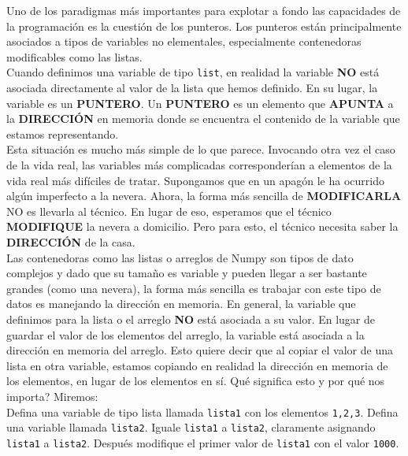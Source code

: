 \documentclass[11pt,letterpaper]{exam}
\begin{document}
\begin{questions}

Uno de los paradigmas m\'as importantes para explotar a fondo las capacidades de la programaci\'on es la cuesti\'on de los punteros. Los punteros est\'an principalmente asociados a tipos de variables no elementales, especialmente contenedoras modificables como las listas.\\

Cuando definimos una variable de tipo \verb"list", en realidad la variable \textbf{NO} est\'a asociada directamente al valor de la lista que hemos definido. En su lugar, la variable es un \textbf{PUNTERO}. Un \textbf{PUNTERO} es un elemento que \textbf{APUNTA} a la \textbf{DIRECCI\'ON} en memoria donde se encuentra el contenido de la variable que estamos representando.\\

Esta situaci\'on es mucho m\'as simple de lo que parece. Invocando otra vez el caso de la vida real, las variables m\'as complicadas corresponder\'ian a elementos de la vida real m\'as dif\'iciles de tratar. Supongamos que en un apag\'on le ha ocurrido alg\'un imperfecto a la nevera. Ahora, la forma m\'as sencilla de \textbf{MODIFICARLA} NO es llevarla al t\'ecnico. En lugar de eso, esperamos que el t\'ecnico \textbf{MODIFIQUE} la nevera a domicilio. Pero para esto, el t\'ecnico necesita saber la \textbf{DIRECCI\'ON} de la casa.\\
 
Las contenedoras como las listas o arreglos de Numpy son tipos de dato complejos y dado que su tama\~no es variable y pueden llegar a ser bastante grandes (como una nevera), la forma m\'as sencilla es trabajar con este tipo de datos es manejando la direcci\'on en memoria. En general, la variable que definimos para la lista o el arreglo \textbf{NO} est\'a asociada a su valor. En lugar de guardar el valor de los elementos del arreglo, la variable est\'a asociada a la direcci\'on en memoria del arreglo. Esto quiere decir que al copiar el valor de una lista en otra variable, estamos copiando en realidad la direcci\'on en memoria de los elementos, en lugar de los elementos en s\'i. Qu\'e significa esto y por qu\'e nos importa? Miremos:\\

Defina una variable de tipo lista llamada \verb"lista1" con los elementos \verb"1,2,3". Defina una variable llamada \verb"lista2". Iguale \verb"lista1" a \verb"lista2", claramente asignando \verb"lista1" a \verb"lista2". Despu\'es modifique el primer valor de \verb"lista1" con el valor \verb"1000".\\


\end{questions}
\end{document}

